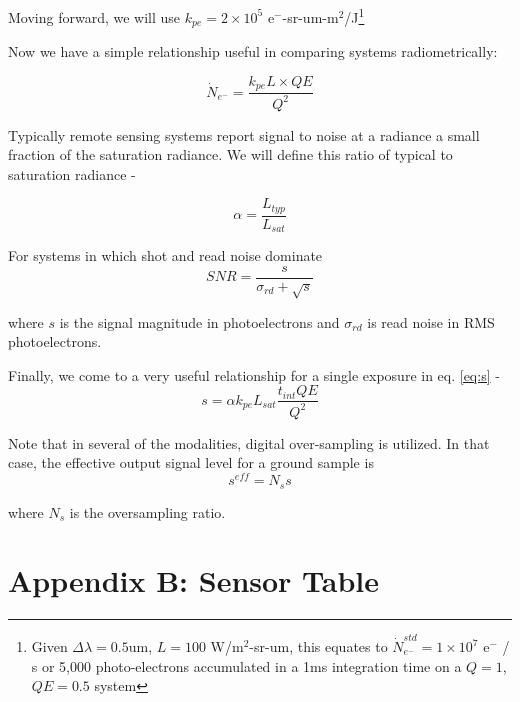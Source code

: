 \documentclass[]{spieman}  %
\begin{document}
Moving forward, we will use $k_{pe} = 2\times 10^5$ e$^-$-sr-um-m$^2$/J\footnote{Given $\Delta \lambda = 0.5$um, $L = 100$ W/m$^2$-sr-um, this equates to $\dot{N}_{e^-}^{std} = 1\times 10^7$ e$^-$ / s or 5,000 photo-electrons accumulated in a 1ms integration time on a $Q=1$, $QE=0.5$ system}

Now we have a simple relationship useful in comparing systems radiometrically:

\begin{equation}
\dot{N}_{e^-} = \frac{k_{pe} L \times QE}{Q^2}
\label{eq:N_e_dot}
\end{equation}

Typically remote sensing systems report signal to noise at a radiance a small fraction of the saturation radiance.  We will define this ratio of typical to saturation radiance - 

\begin{equation}
\alpha = \frac{L_{typ}}{L_{sat}}
\label{eq:alpha}
\end{equation}

For systems in which shot and read noise dominate
\begin{equation}
SNR = \frac{s}{\sigma_{rd} + \sqrt{s}}
\label{eq:snr}
\end{equation}

where $s$ is the signal magnitude in photoelectrons and $\sigma_{rd}$ is read noise in RMS photoelectrons.

Finally, we come to a very useful relationship for a single exposure in eq. \eqref{eq:s} -
\begin{equation}
s = \alpha k_{pe}L_{sat} \frac{t_{int}QE}{Q^2}
\label{eq:s}
\end{equation}

Note that in several of the modalities, digital over-sampling is utilized.  In that case, the effective output signal level for a ground sample is 
\begin{equation*}
    s^{eff} = N_s s
\end{equation*}

where $N_s$ is the oversampling ratio.

\section{Appendix B: Sensor Table}
\label{sec:appendix_b}




\end{document}
